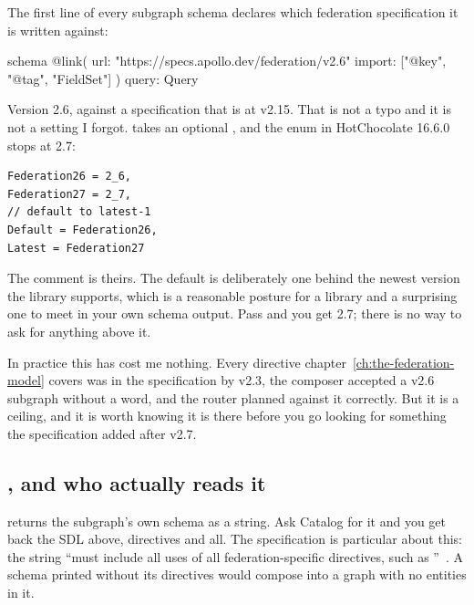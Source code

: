 %
The first line of every subgraph schema declares which federation specification
it is written against:

\begin{graphqlsdl}
schema
  @link(
    url: "https://specs.apollo.dev/federation/v2.6"
    import: ["@key", "@tag", "FieldSet"]
  ) {
  query: Query
}
\end{graphqlsdl}

Version 2.6, against a specification that is at v2.15. That is not a typo and it
is not a setting I forgot.  takes an optional
, and the enum in HotChocolate 16.6.0 stops at 2.7:

\begin{verbatim}
Federation26 = 2_6,
Federation27 = 2_7,
// default to latest-1
Default = Federation26,
Latest = Federation27
\end{verbatim}

%
The comment is theirs. The default is deliberately one behind the newest version
the library supports, which is a reasonable posture for a library and a
surprising one to meet in your own schema output. Pass
 and you get 2.7; there is no way to ask for
anything above it.

In practice this has cost me nothing. Every directive
chapter~\ref{ch:the-federation-model} covers was in the specification by v2.3,
the composer accepted a v2.6 subgraph without a word, and the router planned
against it correctly. But it is a ceiling, and it is worth knowing it is there
before you go looking for something the specification added after v2.7.

\subsection*{, and who actually reads it}

%
 returns the subgraph's own schema as a string. Ask Catalog for
it and you get back the SDL above, directives and all. The specification is
particular about this: the string \enquote{must include all uses of all
federation-specific directives, such as
}~\autocite{apollo2026subgraphspec}. A schema printed without its
 directives would compose into a graph with no entities in it.

